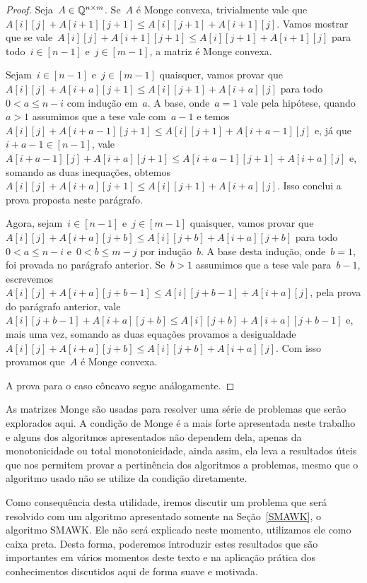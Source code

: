 \begin{proof}
Seja~$A \in \mathbb{Q}^{n \times m}$. Se~$A$ é Monge convexa, trivialmente vale que~${A[i][j] + A[i+1][j+1] \leq A[i][j+1] + A[i+1][j]}$. Vamos mostrar que se vale~${A[i][j] + A[i+1][j+1] \leq A[i][j+1] + A[i+1][j]}$ para todo~${i \in [n-1]}$ e~${j \in [m-1]}$, a matriz é Monge convexa. 

Sejam~${i \in [n-1]}$ e~${j \in [m-1]}$ quaisquer, vamos provar que~${A[i][j] + A[i+a][j+1] \leq A[i][j+1] + A[i+a][j]}$ para todo~${0 < a \leq n - i}$ com indução em~$a$. A base, onde~${a = 1}$ vale pela hipótese, quando~${a > 1}$ assumimos que a tese vale com~${a-1}$ e temos~${A[i][j] + A[i+a-1][j+1] \leq A[i][j+1] + A[i+a-1][j]}$ e, já que~${i + a - 1 \in [n-1]}$, vale~$A[i+a-1][j] + A[i+a][j+1] \leq A[i+a-1][j+1] + A[i+a][j]$ e, somando as duas inequações, obtemos~${A[i][j] + A[i+a][j+1] \leq A[i][j+1] + A[i+a][j]}$. Isso conclui a prova proposta neste parágrafo.

Agora, sejam~${i \in [n-1]}$ e~${j \in [m-1]}$ quaisquer, vamos provar que~${A[i][j] + A[i+a][j+b] \leq A[i][j+b] + A[i+a][j+b]}$ para todo~${0 < a \leq n-i}$ e~${0 < b \leq m-j}$ por indução~$b$. A base desta indução, onde~${b = 1}$, foi provada no parágrafo anterior. Se~${b > 1}$ assumimos que a tese vale para~${b-1}$, escrevemos~${A[i][j] + A[i+a][j+b-1] \leq A[i][j+b-1] + A[i+a][j]}$, pela prova do parágrafo anterior, vale~$A[i][j+b-1] + A[i+a][j+b] \leq A[i][j+b] + A[i+a][j+b-1]$ e, mais uma vez, somando as duas equações provamos a desigualdade~${A[i][j] + A[i+a][j+b] \leq A[i][j+b] + A[i+a][j]}$. Com isso provamos que~$A$ é Monge convexa.

A prova para o caso côncavo segue análogamente.
\end{proof}

As matrizes Monge são usadas para resolver uma série de problemas que serão explorados aqui. A condição de Monge é a mais forte apresentada neste trabalho e alguns dos algoritmos apresentados não dependem dela, apenas da monotonicidade ou total monotonicidade, ainda assim, ela leva a resultados úteis que nos permitem provar a pertinência dos algoritmos a problemas, mesmo que o algoritmo usado não se utilize da condição diretamente.  

Como consequência desta utilidade, iremos discutir um problema que será resolvido com um algoritmo apresentado somente na Seção~\ref{SMAWK}, o algoritmo SMAWK. Ele não será explicado neste momento, utilizamos ele como caixa preta. Desta forma, poderemos introduzir estes resultados que são importantes em vários momentos deste texto e na aplicação prática dos conhecimentos discutidos aqui de forma suave e motivada.   

